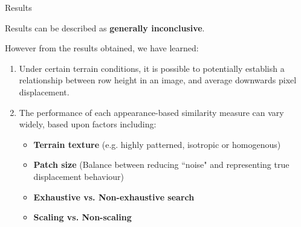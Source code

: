 \documentclass[10pt, compress]{beamer}
\begin{document}
\begin{frame}{Results}

Results can be described as \textbf{generally inconclusive}. \\ \vspace{0.5cm}

However from the results obtained, we have learned:

\begin{enumerate}[label={\arabic*.}]
  \item Under certain terrain conditions, it is possible to potentially establish a relationship between row height in an image, and average downwards pixel displacement. \vspace{0.5cm} 
  \item The performance of each appearance-based similarity measure can vary widely, based upon factors including:
 \vspace{0.2cm} 
  \begin{itemize}[label={\textbullet}]
  	\item \textbf{Terrain texture} (e.g. highly patterned, isotropic or homogenous)
  	\item \textbf{Patch size} (Balance between reducing ``noise" and representing true displacement behaviour)
  	\item \textbf{Exhaustive vs. Non-exhaustive search}
  	\item \textbf{Scaling vs. Non-scaling}
  \end{itemize}
\end{enumerate}

\end{frame}
\end{document}
